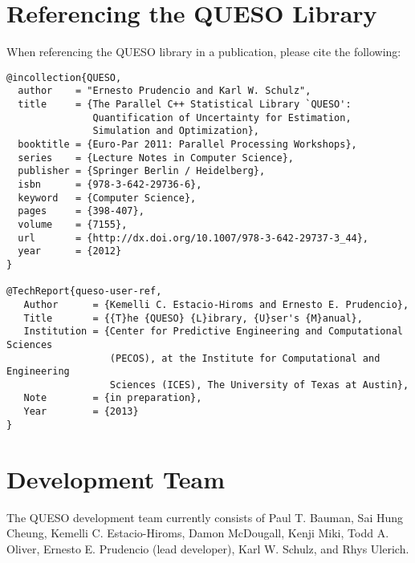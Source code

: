 \section*{Referencing the QUESO Library}
When referencing the QUESO library in a publication, please cite the following:
\begin{verbatim}
@incollection{QUESO,
  author    = "Ernesto Prudencio and Karl W. Schulz",
  title     = {The Parallel C++ Statistical Library `QUESO':
               Quantification of Uncertainty for Estimation,
               Simulation and Optimization},
  booktitle = {Euro-Par 2011: Parallel Processing Workshops},
  series    = {Lecture Notes in Computer Science},
  publisher = {Springer Berlin / Heidelberg},
  isbn      = {978-3-642-29736-6},
  keyword   = {Computer Science},
  pages     = {398-407},
  volume    = {7155},
  url       = {http://dx.doi.org/10.1007/978-3-642-29737-3_44},
  year      = {2012}
}

@TechReport{queso-user-ref,
   Author      = {Kemelli C. Estacio-Hiroms and Ernesto E. Prudencio},
   Title       = {{T}he {QUESO} {L}ibrary, {U}ser's {M}anual},
   Institution = {Center for Predictive Engineering and Computational Sciences
                  (PECOS), at the Institute for Computational and Engineering
                  Sciences (ICES), The University of Texas at Austin},
   Note        = {in preparation},
   Year        = {2013}
}
\end{verbatim}
% 
% 
\section*{\Queso{} Development Team}

The QUESO development team currently consists of
Paul T. Bauman,
Sai Hung Cheung,
Kemelli C. Estacio-Hiroms,
Damon McDougall,
Kenji Miki,
Todd A. Oliver,
Ernesto E. Prudencio (lead developer),
Karl W. Schulz, and
Rhys Ulerich.

% 
